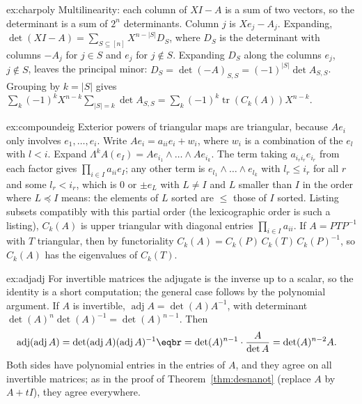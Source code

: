 \begin{solution}{ex:charpoly}
\idea Multilinearity: each column of $XI-A$ is a sum of two vectors, so the determinant is a sum of $2^n$ determinants.
\writeup Column $j$ is $Xe_j-A_j$. Expanding, $\det(XI-A)=\sum_{S\subseteq[n]}X^{n-|S|}D_S$, where $D_S$ is the determinant with
columns $-A_j$ for $j\in S$ and $e_j$ for $j\notin S$. Expanding $D_S$ along the columns $e_j$, $j\notin S$, leaves the
principal minor: $D_S=\det(-A)_{S,S}=(-1)^{|S|}\det A_{S,S}$. Grouping by $k=|S|$ gives
$\sum_k(-1)^kX^{n-k}\sum_{|S|=k}\det A_{S,S}=\sum_k(-1)^k\operatorname{tr}(C_k(A))X^{n-k}$.
\end{solution}

\begin{solution}{ex:compoundeig}
\idea Exterior powers of triangular maps are triangular, because $Ae_i$ only involves $e_1,\dots,e_i$.
\writeup Write $Ae_i=a_{ii}e_i+w_i$, where $w_i$ is a combination of the $e_l$ with $l<i$. Expand
$\Lambda^kA(e_I)=Ae_{i_1}\wedge\dots\wedge Ae_{i_k}$. The term
taking $a_{i_ri_r}e_{i_r}$ from each factor gives $\prod_{i\in I}a_{ii}e_I$; any other term is $e_{l_1}\wedge\dots\wedge e_{l_k}$ with
$l_r\le i_r$ for all $r$ and some $l_r<i_r$, which is $0$ or $\pm e_L$ with $L\neq I$ and $L$ smaller than $I$ in the
order where $L\preceq I$ means: the elements of $L$ sorted are $\le$ those of $I$ sorted. Listing subsets compatibly
with this partial order (the lexicographic order is such a listing), $C_k(A)$ is upper triangular with diagonal entries
$\prod_{i\in I}a_{ii}$. If $A=PTP^{-1}$ with $T$ triangular, then by functoriality $C_k(A)=C_k(P)\,C_k(T)\,C_k(P)^{-1}$, so
$C_k(A)$ has the eigenvalues of $C_k(T)$.
\end{solution}

\begin{solution}{ex:adjadj}
\idea For invertible matrices the adjugate is the inverse up to a scalar, so the identity is a short computation; the
general case follows by the polynomial argument.
\writeup If $A$ is invertible, $\operatorname{adj}A=\det(A)A^{-1}$, with determinant $\det(A)^n\det(A)^{-1}=\det(A)^{n-1}$. Then
\[
\begin{aligned}\operatorname{adj}(\operatorname{adj}A)&=\det(\operatorname{adj}A)(\operatorname{adj}A)^{-1}\eqbr=\det(A)^{n-1}\cdot\frac{A}{\det A}=\det(A)^{n-2}A.\end{aligned}
\]
Both sides have polynomial entries in the entries of $A$, and they agree on all invertible matrices; as in the proof of
Theorem~\ref{thm:desnanot} (replace $A$ by $A+tI$), they agree everywhere.
\end{solution}

